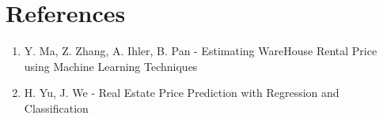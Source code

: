 \section{References}

\begin{enumerate}
	\item Y. Ma, Z. Zhang, A. Ihler, B. Pan - Estimating WareHouse Rental Price using Machine Learning Techniques
	\item H. Yu, J. We - Real Estate Price Prediction with Regression and Classification
\end{enumerate}
